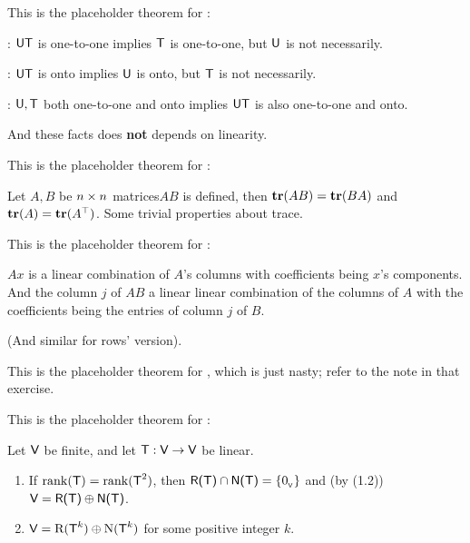 \begin{additional theorem} \label{athm 2.26}
This is the placeholder theorem for :

: \(\textsf{U}\textsf{T}\) is one-to-one implies \(\textsf{T}\) is one-to-one, but \(\textsf{U}\) is not necessarily.

: \(\textsf{U}\textsf{T}\) is onto implies \(\textsf{U}\) is onto, but \(\textsf{T}\) is not necessarily.

: \(\textsf{U}, \textsf{T}\) both one-to-one and onto implies \(\textsf{U}\textsf{T}\) is also one-to-one and onto.

And these facts does \textbf{not} depends on linearity.
\end{additional theorem}

\begin{additional theorem} \label{athm 2.27}
This is the placeholder theorem for :

Let \(A, B\) be \(n \times n\) matrices\(AB\) is defined, then \(\textbf{tr}(AB) = \textbf{tr}(BA)\) and \(\textbf{tr}(A) = \textbf{tr}(A^\top)\).
Some trivial properties about trace.
\end{additional theorem}

\begin{additional theorem} \label{athm 2.28}
This is the placeholder theorem for :

\(Ax\) is a linear combination of \(A\)'s columns with coefficients being \(x\)'s components.
And the column \(j\) of \(AB\) a linear linear combination of the columns of \(A\) with the coefficients being the entries of column \(j\) of \(B\).

(And similar for rows' version).
\end{additional theorem}

\begin{additional theorem} \label{athm 2.29}
This is the placeholder theorem for , which is just nasty;
refer to the note in that exercise.
\end{additional theorem}

\begin{additional theorem} \label{athm 2.30}
This is the placeholder theorem for :

Let \(\textsf{V}\) be finite, and let \(\textsf{T} : \textsf{V} \to \textsf{V}\) be linear.
\begin{enumerate}
\item If \(\mathrm{rank}(\textsf{T}) = \mathrm{rank}(\textsf{T}^2)\), then \(\textsf{R(T)} \cap \textsf{N(T)} = \{ 0_{_{\textsf{V}}} \}\) and (by (1.2)) \(\textsf{V} = \textsf{R(T)} \oplus \textsf{N(T)}\).
\item \(\textsf{V} = \mathrm{R}(\textsf{T}^k) \oplus \mathrm{N}(\textsf{T}^k)\) for some positive integer \(k\).
\end{enumerate}
\end{additional theorem}

